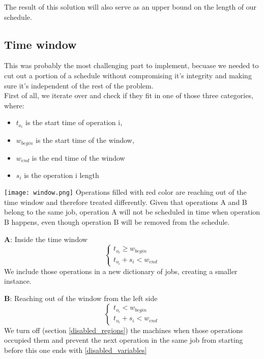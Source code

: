 \documentclass[letterpaper, 11pt]{article}
\begin{document}
\begin{multicols}{2}
The result of this solution will also serve as an upper bound on
the length of our schedule.

\subsection{Time window}
This was probably the most challenging part to implement, becuase we needed to
cut out a portion of a schedule without compromising it's integrity and making
sure it's independent of the rest of the problem. \\
First of all, we iterate over and check if they fit in one of those three
categories, where:
\begin{itemize}
\item $t_{o_i}$ is the start time of operation i,
\item $w_{begin}$ is the start time of the window,
\item $w_{end}$ is the end time of the window
\item $s_i$ is the operation i length
\end{itemize}

\texttt{[image: window.png]}
Operations filled with red color are reaching out of the time
window and therefore treated differently. Given that operations
A and B belong to the same job, operation A will not be scheduled
in time when operation B happens, even though operation B will be
removed from the schedule.

\textbf{A}: Inside the time window
\begin{equation}
    \begin{cases}
        t_{o_i} \geq w_{begin}\\
        t_{o_i} + s_i < w_{end}
    \end{cases}
\end{equation}
We include those operations in a new dictionary of jobs, creating a smaller
instance.
\smallskip

\textbf{B}: Reaching out of the window from the left side
\begin{equation}
    \begin{cases}
        t_{o_i} < w_{begin}\\
        t_{o_i} + s_i < w_{end}
    \end{cases}
\end{equation}
We turn off (section \ref{disabled_regions}) the machines when those operations 
occupied them and prevent the next operation in the same job from starting 
before this one ends with \ref{disabled_variables}
\smallskip


\end{multicols}
\end{document}
